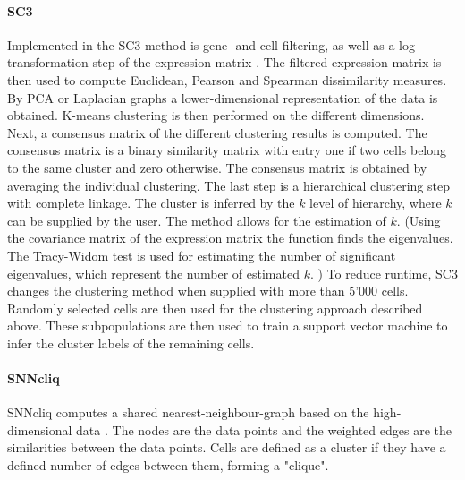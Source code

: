 \documentclass[12pt, a4paper]{article}\usepackage[]{graphicx}\usepackage[]{color}
\begin{document}
\paragraph{SC3}
Implemented in the SC3 method is gene- and cell-filtering, as well as a log transformation step of the expression matrix \citep{kiselev2017sc3}. The filtered expression matrix is then used to compute  Euclidean, Pearson and  Spearman dissimilarity measures. By PCA or Laplacian graphs a lower-dimensional representation of the data is obtained.  K-means clustering is then performed on the different dimensions. Next, a consensus matrix of the different clustering results is computed. The consensus matrix is a binary similarity matrix with entry one if two cells belong to the same cluster and zero otherwise. The consensus matrix is obtained by averaging the individual clustering. The last step is a hierarchical clustering step with complete linkage. The cluster is inferred by the $k$ level of hierarchy, where $k$ can be supplied by the user. The method allows for the estimation of $k$. (Using the covariance matrix of the expression matrix the function finds the eigenvalues. The Tracy-Widom test is used for estimating the number of significant eigenvalues, which represent the number of estimated $k$. )
To reduce runtime, SC3 changes the clustering method when supplied with more than 5'000 cells. Randomly selected cells are then used for the clustering approach described above. These subpopulations are then used to train a support vector machine to infer the cluster labels of the remaining cells.
\paragraph{SNNcliq}
SNNcliq computes a shared nearest-neighbour-graph based on the high-dimensional data \citep{xu2015identification}. The nodes are the data points and the weighted edges are the similarities between the data points. Cells are defined as a cluster if they have a defined number of edges between them, forming a "clique". 
\end{document}
